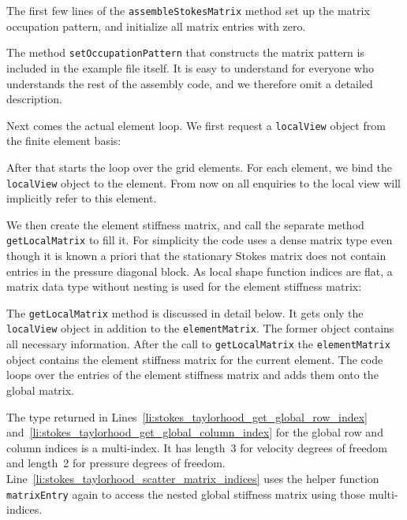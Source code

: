 \documentclass[a4paper,10pt,headings=normal,bibliography=totoc]{scrartcl}
\newcommand{\cpp}[1]{\lstinline[basicstyle=\ttfamily]!#1!}
\begin{document}
The first few lines of the \cpp{assembleStokesMatrix} method set up the matrix occupation pattern,
and initialize all matrix entries with zero.
%

%
The method \cpp{setOccupationPattern} that constructs the matrix pattern is included
in the example file itself.  It is easy to understand for everyone who understands
the rest of the assembly code, and we therefore omit a detailed description.

Next comes the actual element loop.  We first request a \cpp{localView} object
from the finite element basis:
%

%
After that starts the loop over the grid elements.  For each element, we bind the \cpp{localView} object
to the element.
From now on all enquiries to the local view will implicitly refer to this element.
%

%
We then create the element stiffness matrix, and call the separate method \cpp{getLocalMatrix} to fill it.
For simplicity the code uses a dense matrix type even though it is known a priori
that the stationary Stokes matrix does not contain entries in the pressure diagonal block.
As local shape function indices are flat, a matrix data type without nesting is used
for the element stiffness matrix:
%

%
The \cpp{getLocalMatrix} method is discussed in detail below.
It gets only the \cpp{localView} object in addition to the \cpp{elementMatrix}.  The former object contains
all necessary information.
After the call to \cpp{getLocalMatrix} the \cpp{elementMatrix} object contains the
element stiffness matrix for the current element.
The code loops over the entries of the element stiffness matrix and adds them onto the global matrix.
%

%
The type returned in Lines~\ref{li:stokes_taylorhood_get_global_row_index} and~\ref{li:stokes_taylorhood_get_global_column_index}
for the global row and column indices is a multi-index.  It has length~3 for velocity degrees of freedom and
length~2 for pressure degrees of freedom.
Line~\ref{li:stokes_taylorhood_scatter_matrix_indices} uses the helper function
\cpp{matrixEntry} again to access the nested global stiffness matrix using those multi-indices.
\end{document}

